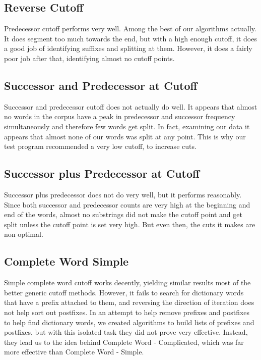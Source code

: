 \documentclass[11pt,letterpaper]{article}
\begin{document}
\subsection{Reverse Cutoff}
  Predecessor cutoff performs very well. Among the best of our algorithms actually. It does segment too much towards the end, but with a high enough cutoff, it does a good job of identifying suffixes and splitting at them. However, it does a fairly poor job after that, identifying almost no cutoff points. 

    
\subsection{Successor and Predecessor at Cutoff}
  Successor and predecessor cutoff does not actually do well. It appears that almost no words in the corpus have a peak in predecessor and successor frequency simultaneously and therefore few words get split. In fact, examining our data it appears that almost none of our words was split at any point. This is why our test program recommended a very low cutoff, to increase cuts. 
    
    
\subsection{Successor plus Predecessor at Cutoff}
  Successor plus predecessor does not do very well, but it performs reasonably. Since both successor and predecessor counts are very high at the beginning and end of the words, almost no substrings did not make the cutoff point and get split unless the cutoff point is set very high. But even then, the cuts it makes are non optimal.

    
\subsection{Complete Word Simple}
  Simple complete word cutoff works decently, yielding similar results most of the better generic cutoff methods. However, it fails to search for dictionary words that have a prefix attached to them, and reversing the direction of iteration does not help sort out postfixes. In an attempt to help remove prefixes and postfixes to help find dictionary words, we created algorithms to build lists of prefixes and postfixes, but with this isolated task they did not prove very effective. Instead, they lead us to the idea behind Complete Word - Complicated, which was far more effective than Complete Word - Simple.  
    
\end{document}
